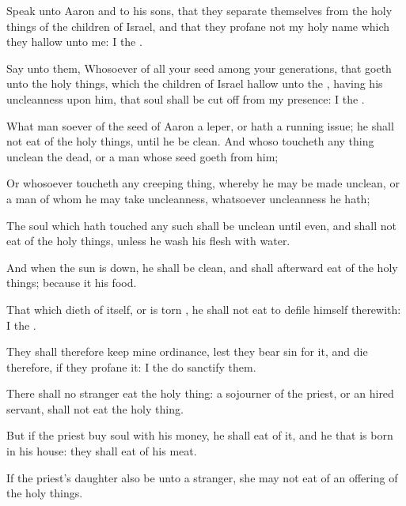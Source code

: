 {Speak unto
Aaron and to his
sons, that they
separate themselves from the holy
things of the
children of
Israel, and that they
profane not my
holy
name
{} which they
hallow unto me: I
{} the
{}.

Say unto them,
Whosoever
{} of all your
seed among your
generations, that
goeth unto the holy
things, which the
children of
Israel
hallow unto the
{}, having his
uncleanness upon him, that
soul shall be cut
off from my
presence: I
{} the
{}.

What man
soever of the
seed of
Aaron
{} a
leper, or hath a running
issue; he shall not
eat of the holy
things, until he be
clean. And whoso
toucheth any thing
{}
unclean
{} the
dead, or a
man whose
seed
goeth from him;

Or
whosoever
toucheth any creeping
thing, whereby he may be made
unclean, or a
man of whom he may take
uncleanness, whatsoever
uncleanness he hath;

The
soul which hath
touched any such shall be
unclean until
even, and shall not
eat of the holy
things,
unless he
wash his
flesh with
water.

And when the
sun is
down, he shall be
clean, and shall
afterward
eat of the holy
things; because it
{} his
food.

That which dieth of
itself, or is
torn
{}, he shall not
eat to
defile himself therewith: I
{} the
{}.

They shall therefore
keep mine
ordinance, lest they
bear
sin for it, and
die therefore, if they
profane it: I the
{} do
sanctify them.


\par }{\PP {}There shall no
stranger
eat
{} the holy
thing: a
sojourner of the
priest, or an hired
servant, shall not
eat
{} the holy
thing.

But if the
priest
buy
{}
soul
with his
money, he shall
eat of it, and he that is
born in his
house: they shall
eat of his
meat.

If the
priest’s
daughter also be
{} unto a
stranger, she may not
eat of an
offering of the holy
things.

}
